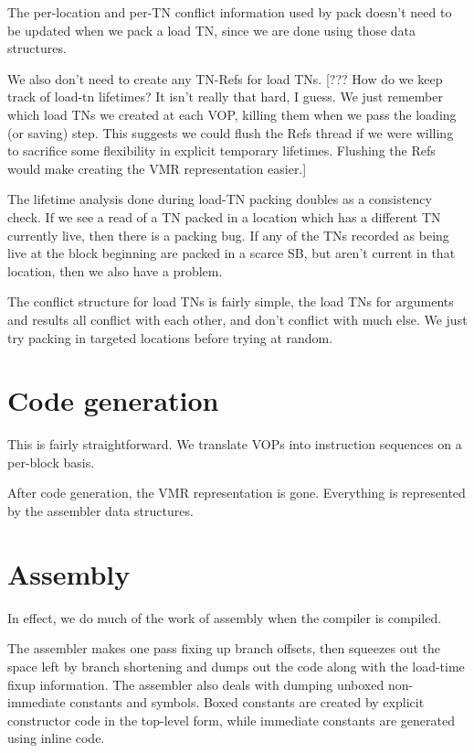 The per-location and per-TN conflict information used by pack doesn't
need to be updated when we pack a load TN, since we are done using those data
structures.

We also don't need to create any TN-Refs for load TNs.  [??? How do we keep
track of load-tn lifetimes?  It isn't really that hard, I guess.  We just
remember which load TNs we created at each VOP, killing them when we pass the
loading (or saving) step.  This suggests we could flush the Refs thread if we
were willing to sacrifice some flexibility in explicit temporary lifetimes.
Flushing the Refs would make creating the VMR representation easier.]

The lifetime analysis done during load-TN packing doubles as a consistency
check.  If we see a read of a TN packed in a location which has a different TN
currently live, then there is a packing bug.  If any of the TNs recorded as
being live at the block beginning are packed in a scarce SB, but aren't current
in that location, then we also have a problem.

The conflict structure for load TNs is fairly simple, the load TNs for
arguments and results all conflict with each other, and don't conflict with
much else.  We just try packing in targeted locations before trying at random.



\chapter{Code generation}

This is fairly straightforward.  We translate VOPs into instruction sequences
on a per-block basis.

After code generation, the VMR representation is gone.  Everything is
represented by the assembler data structures.


\chapter{Assembly}

In effect, we do much of the work of assembly when the compiler is compiled.

The assembler makes one pass fixing up branch offsets, then squeezes out the
space left by branch shortening and dumps out the code along with the load-time
fixup information.  The assembler also deals with dumping unboxed non-immediate
constants and symbols.  Boxed constants are created by explicit constructor
code in the top-level form, while immediate constants are generated using
inline code.

